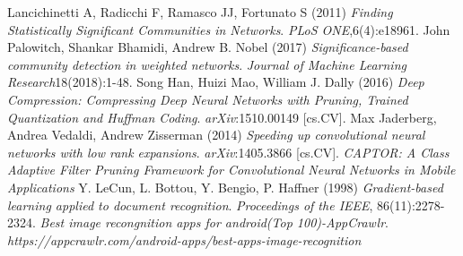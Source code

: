 \documentclass{acmtog} %
\begin{document}

\begin{thebibliography}{00}

Lancichinetti A, Radicchi F, Ramasco JJ, Fortunato S (2011) \emph{Finding Statistically Significant Communities in Networks}. \emph{PLoS ONE},6(4):e18961.
John Palowitch, Shankar Bhamidi, Andrew B. Nobel (2017) \emph{Significance-based community detection in weighted networks}. \emph{Journal of Machine Learning Research}18(2018):1-48.
Song Han, Huizi Mao, William J. Dally (2016) \emph{Deep Compression: Compressing Deep Neural Networks with Pruning, Trained Quantization and Huffman Coding}. \emph{arXiv}:1510.00149 [cs.CV].
Max Jaderberg, Andrea Vedaldi, Andrew Zisserman (2014) \emph{Speeding up convolutional neural networks with low rank expansions}. \emph{arXiv}:1405.3866 [cs.CV].
\emph{CAPTOR: A Class Adaptive Filter Pruning Framework for Convolutional Neural Networks in Mobile Applications}
Y. LeCun, L. Bottou, Y. Bengio, P. Haffner (1998) \emph{Gradient-based learning applied to document recognition}. \emph{Proceedings of the IEEE}, 86(11):2278-2324.
\emph{Best image recongnition apps for android(Top 100)-AppCrawlr}. \emph{https://appcrawlr.com/android-apps/best-apps-image-recognition}
\end{thebibliography}
\end{document}
